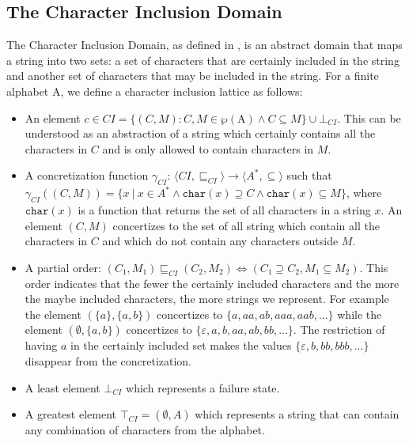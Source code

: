 \documentclass[10pt]{report}
\begin{document}
\subsection{The Character Inclusion Domain}
The Character Inclusion Domain, as defined in \cite{character}, is an abstract domain that maps a string into two sets: a set of characters that are certainly included in the string and another set of characters that may be included in the string. 
For a finite alphabet $\mathrm{A}$, we define a character inclusion lattice as follows: 
\begin{itemize}
	\item An element $c \in CI = \lbrace(C, M): C, M \in \wp (\mathrm{A}) \land C \subseteq M \rbrace \cup \bot_{CI}$. This can be understood as an abstraction of a string which certainly contains all the characters in $C$ and is only allowed to contain characters in $ M $.
	
	\item A concretization function $\gamma_{CI}$: $\langle CI, \sqsubseteq_{CI}\rangle  \longrightarrow \langle A^{*}, \subseteq\rangle$ such that \\ $ \gamma_{CI}((C, M)) = \lbrace x\ \vert\ x \in A^{*} \wedge \mathtt{char}(x) \supseteq C \wedge \mathtt{char}(x) \subseteq M \rbrace $, where $ \mathtt{char}(x) $ is a function that returns the set of all characters in a string  $ x $.  An element $ (C, M) $ concertizes to the set of all string which contain all the characters in $ C $ and which do not contain any characters outside $ M $. 
	
	\item A partial order: $(C_{1}, M_{1}) \sqsubseteq_{CI} (C_{2}, M_{2}) \iff (C_{1} \supseteq C_{2}, M_{1} \subseteq M_{2})$. This order indicates that the fewer the certainly included characters and the more the maybe included characters, the more strings we represent. For example the element $(\lbrace a \rbrace , \lbrace a,b \rbrace)$ concertizes to $\lbrace a, aa, ab, aaa, aab,... \rbrace$ while the element $(\emptyset, \lbrace a, b \rbrace)$ concertizes to $\lbrace\varepsilon, a, b, aa, ab, bb,...\rbrace$. The restriction of having $a$ in the certainly included set makes the values $\lbrace \varepsilon, b, bb, bbb,...\rbrace $ disappear from the concretization. 
	
	\item A least element $\bot_{CI}$ which represents a failure state. 
	\item A greatest element $\top_{CI} = (\emptyset, A) $ which represents a string that can contain any combination of characters from the alphabet. 
	

\end{itemize}
\end{document}

